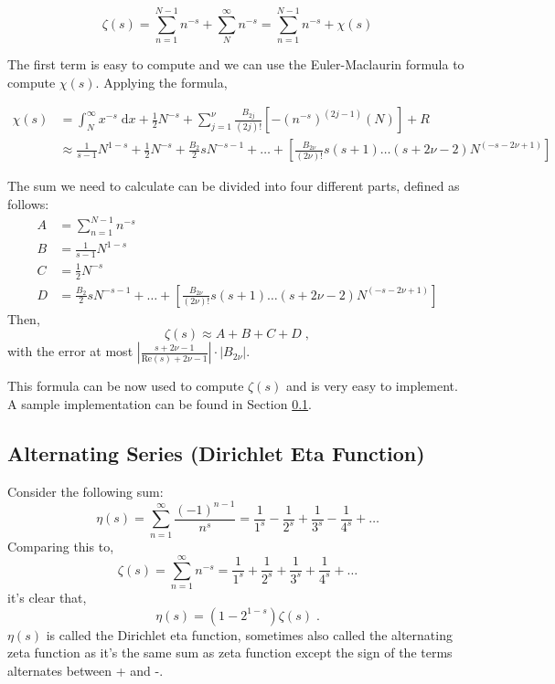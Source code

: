 \documentclass{amsproc}
\newcommand{\be}{\begin{equation}}
\newcommand{\ee}{\end{equation}}
\newcommand{\df}{\; \mathrm{d}}
\theoremstyle{definition}
\theoremstyle{remark}
\numberwithin{equation}{section}
\begin{document}
\be
\label{eqn:euler_main}
\zeta(s)  = \sum_{n = 1}^{N - 1} n^{-s} + \sum_{N}^{\infty} n^{-s} = \sum_{n = 1}^{N - 1} n^{-s} + \chi(s)
\ee

The first term is easy to compute and we can use the Euler-Maclaurin formula to compute $\chi(s)$. Applying the formula, 

\begin{align*}
\chi(s) &= \int_N^{\infty} x^{-s} \df x + \frac{1}{2} N^{-s} + \sum_{j = 1}^{\nu} \frac{B_{2j}}{ (2j)! } \left[ - (n^{-s})^{(2j - 1)} (N) \right] + R \\
& \approx \frac{1}{s - 1} N^{1 - s}  + \frac{1}{2} N^{-s} + \frac{B_2}{2} s N^{-s - 1} + \ldots + \left[ \frac{B_{2 \nu}}{ (2\nu)! } s(s + 1)  \ldots (s + 2 \nu - 2) N^{( -s - 2\nu + 1)} \right]
\end{align*}

The sum we need to calculate can be divided into four different parts, defined as follows:
\begin{align*}
 A &= \sum_{n = 1}^{N - 1} n^{-s} \\
 B &= \frac{1}{s - 1} N^{1 - s} \\
 C &= \frac{1}{2} N^{-s} \\
 D &= \frac{B_2}{2} s N^{-s - 1} + \ldots + \left[ \frac{B_{2 \nu}}{ (2\nu)! } s(s + 1)  \ldots (s + 2 \nu - 2) N^{( -s - 2\nu + 1)} \right]
\end{align*}
Then, 
\begin{equation*}
 \zeta(s) \approx A + B + C + D \;,
\end{equation*}
with the error at most $\left| \frac{s + 2 \nu - 1}{ \mathrm{Re}(s) + 2\nu - 1 } \right|  \cdot \left| B_{2 \nu} \right|$. 

This formula can be now used to compute $\zeta(s)$ and is very easy to implement. A sample implementation can be found in Section \ref{}. 

\subsection{Alternating Series (Dirichlet Eta Function)}
Consider the following sum:
\be
\label{eqn:alternating_series}
\eta(s) = \sum_{n = 1}^{\infty} \frac{ (-1)^{n - 1} }{n^s} = \frac{1}{1^s} - \frac{1}{2^s} + \frac{1}{3^s} - \frac{1}{4^s} + \ldots
\ee
Comparing this to,
\begin{equation*}
 \zeta(s) = \sum_{n = 1}^{\infty} n^{-s} = \frac{1}{1^s} + \frac{1}{2^s} + \frac{1}{3^s} + \frac{1}{4^s} + \ldots
\end{equation*}
it's clear that,
\be
\label{eqn:dir_zeta}
\eta(s) = \left( 1 - 2^{1 - s} \right) \zeta(s) \;.
\ee
$\eta(s)$ is called the Dirichlet eta function, sometimes also called the alternating zeta function as it's the same sum as zeta function except the sign of the terms alternates between + and -. 
\end{document}
